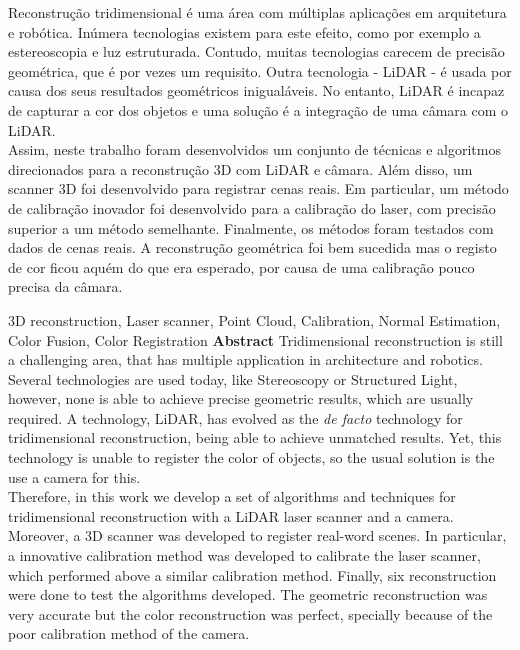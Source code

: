 
\TitlePage
\vspace*{55mm}
    { Reconstrução tridimensional é uma área com múltiplas aplicações em arquitetura e robótica. Inúmera tecnologias existem para este efeito, como por exemplo a estereoscopia e luz estruturada. Contudo, muitas tecnologias carecem de precisão geométrica, que é por vezes um requisito. Outra tecnologia - LiDAR - é usada por causa dos seus resultados geométricos inigualáveis. No entanto, LiDAR é incapaz de capturar a cor dos objetos e uma solução é a integração de uma câmara com o LiDAR.\\
      Assim, neste trabalho foram desenvolvidos um conjunto de técnicas e algoritmos direcionados para a reconstrução 3D com LiDAR e câmara. Além disso, um scanner 3D foi desenvolvido para registrar cenas reais. Em particular, um método de calibração inovador foi desenvolvido para a calibração do laser, com precisão superior a um método semelhante.
      Finalmente, os métodos foram testados com dados de cenas reais. A reconstrução geométrica foi bem sucedida mas o registo de cor ficou aquém do que era esperado, por causa de uma calibração pouco precisa da câmara.
    }
\EndTitlePage
\titlepage\ \endtitlepage

\TitlePage
\vspace*{55mm}
    {3D reconstruction, Laser scanner, Point Cloud, Calibration, Normal Estimation, Color Fusion, Color Registration}
\vspace*{15mm}
\TEXT
    {\textbf{Abstract}}
    { Tridimensional reconstruction is still a challenging area, that has multiple application in architecture and robotics. Several technologies are used today, like Stereoscopy or Structured Light, however, none is able to achieve precise geometric results, which are usually required. A technology, LiDAR, has evolved as the \textit{de facto} technology for tridimensional reconstruction, being able to achieve unmatched results. Yet, this technology is unable to register the color of objects, so the usual solution is the use a camera for this.\\
    Therefore, in this work we develop a set of algorithms and techniques for tridimensional reconstruction with a LiDAR laser scanner and a camera. Moreover, a 3D scanner was developed to register real-word scenes. In particular, a innovative calibration method was developed to calibrate the laser scanner, which performed above a similar calibration method.
    Finally, six reconstruction were done to test the algorithms developed. The geometric reconstruction was very accurate but the color reconstruction was perfect, specially because of the poor calibration method of the camera.}
\EndTitlePage
\titlepage\ \endtitlepage
